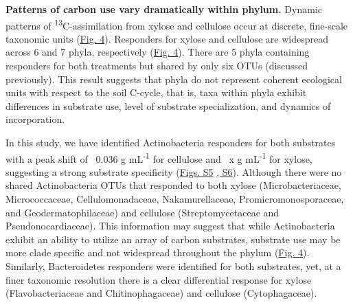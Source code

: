 \textbf{Patterns of carbon use vary dramatically within phylum.} Dynamic patterns of \textsuperscript{13}C-assimilation from xylose and cellulose occur at discrete, fine-scale taxonomic units (\href{https://authorea.com/users/3537/articles/3612/master/file/figures/bacteria_tree/bacteria_tree.png}{Fig. 4}). Responders for xylose and cellulose are widespread across 6 and 7 phyla, respectively (\href{https://authorea.com/users/3537/articles/3612/master/file/figures/bacteria_tree/bacteria_tree.png}{Fig. 4}). There are 5 phyla containing responders for both treatments but shared by only six OTUs (discussed previously). This result suggests that phyla do not represent coherent ecological units with respect to the soil C-cycle, that is, taxa within phyla exhibit differences in substrate use, level of substrate specialization, and dynamics of incorporation. 

In this study, we have identified Actinobacteria responders for both substrates with a peak shift of ~0.036 g mL\textsuperscript{-1} for cellulose and ~x g mL\textsuperscript{-1} for xylose, suggesting a strong substrate specificity (\href{https://authorea.com/users/3537/articles/8459/master/file/figures/xylose_resp_profiles/xylose_resp_profiles.png}{Figs. S5} \href{https://authorea.com/users/3537/articles/8459/master/file/figures/cellulose_resp_profiles/cellulose_resp_profiles.png}{, S6}). Although there were no shared Actinobacteria OTUs that responded to both xylose (Microbacteriaceae, Micrococcaceae, Cellulomonadaceae, Nakamurellaceae, Promicromonosporaceae, and Geodermatophilaceae) and cellulose (Streptomycetaceae and Pseudonocardiaceae). This information may suggest that while Actinobacteria exhibit an ability to utilize an array of carbon substrates, substrate use may be more clade specific and not widespread throughout the phylum (\href{https://authorea.com/users/3537/articles/3612/master/file/figures/bacteria_tree/bacteria_tree.png}{Fig. 4}). Similarly, Bacteroidetes responders were identified for both substrates, yet, at a finer taxonomic resolution there is a clear differential response for xylose (Flavobacteriaceae and Chitinophagaceae) and cellulose (Cytophagaceae). 


